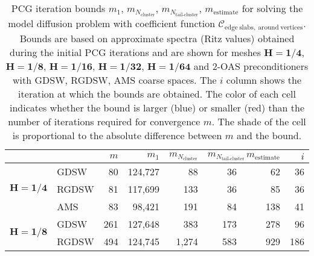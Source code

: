 \begin{table}[H]
\centering
\caption{PCG iteration bounds $m_1$, $m_{N_{\text{cluster}}}$, $m_{N_{\text{tail-cluster}}}$, $m_{\text{estimate}}$ for solving the model diffusion problem with coefficient function $\mathcal{C}_{\mathrm{edge \ slabs, \ around \ vertices}}$. Bounds are based on approximate spectra (Ritz values) obtained during the initial PCG iterations and are shown for meshes $\mathbf{H=1/4}$, $\mathbf{H=1/8}$, $\mathbf{H=1/16}$, $\mathbf{H=1/32}$, $\mathbf{H=1/64}$ and 2-OAS preconditioners with GDSW, RGDSW, AMS coarse spaces. The $i$ column shows the iteration at which the bounds are obtained. The color of each cell indicates whether the bound is larger (blue) or smaller (red) than the number of iterations required for convergence $m$. The shade of the cell is proportional to the absolute difference between $m$ and the bound.}
\label{tab:cg_iteration_bound_coef=slabs_around_vertices}
\begin{tabular}{llrrrrrr}
\toprule
 &  & $m$ & $m_1$ & $m_{N_{\text{cluster}}}$ & $m_{N_{\text{tail-cluster}}}$ & $m_{\text{estimate}}$ & $i$ \\
\midrule
\multirow[c]{3}{*}{$\mathbf{H=1/4}$} & GDSW & 80 & {\cellcolor[HTML]{AFC9F6}} \color[HTML]{000000} 124,727 & {\cellcolor[HTML]{7EAFF1}} \color[HTML]{000000} 88 & {\cellcolor[HTML]{BB9CA9}} \color[HTML]{F1F1F1} 36 & {\cellcolor[HTML]{945357}} \color[HTML]{F1F1F1} 62 & 36 \\
\cline{2-8}
 & RGDSW & 81 & {\cellcolor[HTML]{C1D2F8}} \color[HTML]{000000} 117,699 & {\cellcolor[HTML]{9FC0F4}} \color[HTML]{000000} 133 & {\cellcolor[HTML]{945357}} \color[HTML]{F1F1F1} 36 & {\cellcolor[HTML]{7EAFF1}} \color[HTML]{000000} 85 & 36 \\
\cline{2-8}
 & AMS & 83 & {\cellcolor[HTML]{C9D6F8}} \color[HTML]{000000} 98,421 & {\cellcolor[HTML]{AFC9F6}} \color[HTML]{000000} 191 & {\cellcolor[HTML]{7EAFF1}} \color[HTML]{000000} 84 & {\cellcolor[HTML]{96BCF3}} \color[HTML]{000000} 138 & 41 \\
\cline{1-8} \cline{2-8}
\multirow[c]{3}{*}{$\mathbf{H=1/8}$} & GDSW & 261 & {\cellcolor[HTML]{C1D2F8}} \color[HTML]{000000} 127,648 & {\cellcolor[HTML]{9FC0F4}} \color[HTML]{000000} 383 & {\cellcolor[HTML]{945357}} \color[HTML]{F1F1F1} 173 & {\cellcolor[HTML]{7EAFF1}} \color[HTML]{000000} 278 & 96 \\
\cline{2-8}
 & RGDSW & 494 & {\cellcolor[HTML]{C9D6F8}} \color[HTML]{000000} 124,745 & {\cellcolor[HTML]{AFC9F6}} \color[HTML]{000000} 1,274 & {\cellcolor[HTML]{7EAFF1}} \color[HTML]{000000} 583 & {\cellcolor[HTML]{96BCF3}} \color[HTML]{000000} 929 & 186 \\

\end{tabular}
\end{table}
